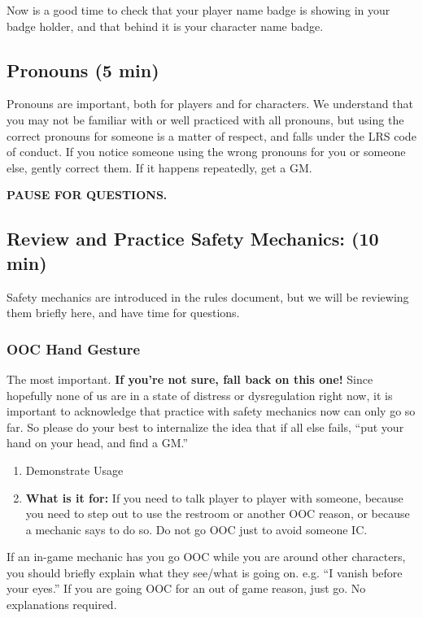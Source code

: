 \documentclass[green]{GL2020}
\begin{document}
Now is a good time to check that your player name badge is showing in your badge holder, and that behind it is your character name badge.


\subsection*{Pronouns (5 min)}
Pronouns are important, both for players and for characters. We understand that you may not be familiar with or well practiced with all pronouns, but using the correct pronouns for someone is a matter of respect, and falls under the LRS code of conduct. If you notice someone using the wrong pronouns for you or someone else, gently correct them. If it happens repeatedly, get a GM.

\textbf{PAUSE FOR QUESTIONS.}

\subsection*{Review and Practice Safety Mechanics: (10 min)}
Safety mechanics are introduced in the rules document, but we will be reviewing them briefly here, and have time for questions.

\subsubsection*{OOC Hand Gesture}
The most important. \textbf{If you’re not sure, fall back on this one!} Since hopefully none of us are in a state of distress or dysregulation right now, it is important to acknowledge that practice with safety mechanics now can only go so far. So please do your best to internalize the idea that if all else fails, ``put your hand on your head, and find a GM.''

\begin{enumerate}
	\item Demonstrate Usage
	\item \textbf{What is it for:} If you need to talk player to player with someone, because you need to step out to use the restroom or another OOC reason, or because a mechanic says to do so. Do not go OOC just to avoid someone IC.
\end{enumerate}	
	
If an in-game mechanic has you go OOC while you are around other characters, you should briefly explain what they see/what is going on. e.g. ``I vanish before your eyes.'' If you are going OOC for an out of game reason, just go. No explanations required.
\end{document}

